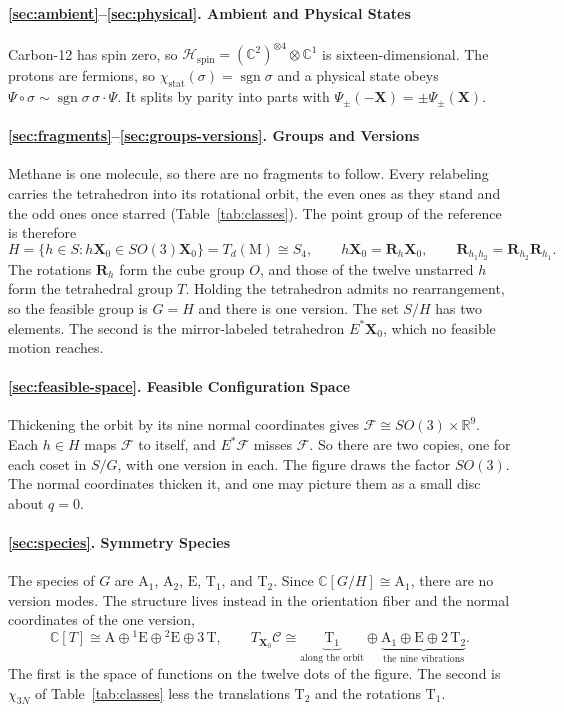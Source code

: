 \documentclass[11pt]{article}
\newcommand{\R}{\mathbb{R}}
\newcommand{\conf}{\mathcal{C}}
\newcommand{\spin}{\mathcal{H}_{\mathrm{spin}}}
\newcommand{\act}{\mathbin{\cdot}}
\newcommand{\stat}{\chi_{\mathrm{stat}}}
\newcommand{\X}{\mathbf{X}}
\newcommand{\Rmat}{\mathbf{R}}
\begin{document}
\paragraph{\ref{sec:ambient}--\ref{sec:physical}. Ambient and Physical States}
Carbon-12 has spin zero, so
$\spin=(\mathbb C^2)^{\otimes4}\otimes\mathbb C^1$ is sixteen-dimensional. The protons are fermions, so
$\stat(\sigma)=\operatorname{sgn}\sigma$ and a physical state obeys
$\Psi\circ\sigma\sim\operatorname{sgn}\sigma\,\sigma\act\Psi$. It splits by parity into parts with
$\Psi_\pm(-\X)=\pm\Psi_\pm(\X)$.

\paragraph{\ref{sec:fragments}--\ref{sec:groups-versions}. Groups and Versions}
Methane is one molecule, so there are no fragments to
follow. Every relabeling carries the tetrahedron into its rotational orbit, the even ones as they stand
and the odd ones once starred (Table~\ref{tab:classes}). The point group of the reference is therefore
\[
H=\{h\in S:h\X_0\in SO(3)\X_0\}=T_d(\mathrm M)\cong S_4,
\qquad
h\X_0=\Rmat_h\X_0,
\qquad
\Rmat_{h_1h_2}=\Rmat_{h_2}\Rmat_{h_1}.
\]
The rotations $\Rmat_h$ form the cube group $O$, and those of the twelve unstarred $h$ form the
tetrahedral group $T$. Holding the tetrahedron admits no rearrangement, so the feasible group is $G=H$
and there is one version. The set $S/H$ has two elements. The second is the mirror-labeled tetrahedron
$E^*\X_0$, which no feasible motion reaches.

\paragraph{\ref{sec:feasible-space}. Feasible Configuration Space}
Thickening the orbit by its nine normal
coordinates gives $\mathcal F\cong SO(3)\times\R^9$. Each $h\in H$ maps $\mathcal F$ to itself, and
$E^*\mathcal F$ misses $\mathcal F$. So there are two copies, one for each coset in $S/G$, with one version
in each. The figure draws the factor $SO(3)$. The normal coordinates thicken it, and one may picture them
as a small disc about $q=0$.

\paragraph{\ref{sec:species}. Symmetry Species}
The species of $G$ are $\mathrm A_1$, $\mathrm A_2$,
$\mathrm E$, $\mathrm T_1$, and $\mathrm T_2$. Since $\mathbb C[G/H]\cong\mathrm A_1$, there are no version
modes. The structure lives instead in the orientation fiber and the normal coordinates of the one
version,
\[
\mathbb C[T]\cong\mathrm A\oplus{}^1\mathrm E\oplus{}^2\mathrm E\oplus3\,\mathrm T,
\qquad
T_{\X_0}\conf
\cong
\underbrace{\mathrm T_1}_{\text{along the orbit}}
\oplus
\underbrace{\mathrm A_1\oplus\mathrm E\oplus2\,\mathrm T_2}_{\text{the nine vibrations}}.
\]
The first is the space of functions on the twelve dots of the figure. The second is $\chi_{3N}$ of
Table~\ref{tab:classes}
less the translations $\mathrm T_2$ and the rotations $\mathrm T_1$.
\end{document}
